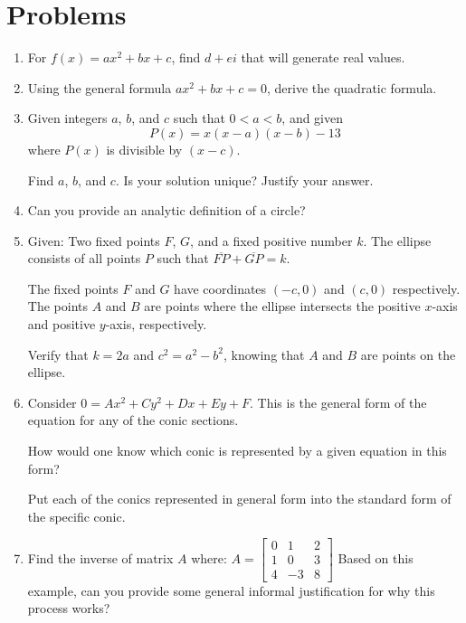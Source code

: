 \documentclass[../precalc.tex]{subfiles}
\begin{document}
\section*{Problems}
\begin{enumerate}
    \item For $f(x)=ax^2+bx+c$, find $d+ei$ that will generate real values.
    \item Using the general formula $ax^2+bx+c=0$, derive the quadratic formula.
    \item Given integers $a$, $b$, and $c$ such that $0<a<b$, and given 
    \[P(x)=x(x-a)(x-b)-13\]
    where $P(x)$ is divisible by $(x-c)$.

    Find $a$, $b$, and $c$. Is your solution unique? Justify your answer.

    \item Can you provide an analytic definition of a circle?
    \item Given: Two fixed points $F$, $G$, and a fixed positive number $k$. The ellipse consists of all points $P$ such that $\overline{FP}+\overline{GP}=k$. 
    
    The fixed points $F$ and $G$ have coordinates $(-c,0)$ and $(c,0)$ respectively. The points $A$ and $B$ are points where the ellipse intersects the positive $x$-axis and positive $y$-axis, respectively.
    
    Verify that $k=2a$ and $c^2=a^2-b^2$, knowing that $A$ and $B$ are points on the ellipse.

    \item Consider $0=Ax^2+Cy^2+Dx+Ey+F$. This is the general form of the equation for any of the conic sections. 
    
    How would one know which conic is represented by a given equation in this form?

    Put each of the conics represented in general form into the standard form of the specific conic.
    \item Find the inverse of matrix $A$ where:
    $A = \begin{bmatrix}
        0 & 1 & 2\\
        1 & 0 & 3\\
        4 & -3 & 8
    \end{bmatrix}$
    Based on this example, can you provide some general informal justification for why this process works?
\end{enumerate}
\end{document}
